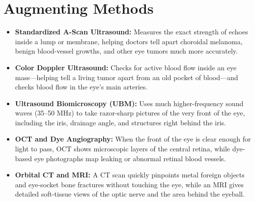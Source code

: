 \section{Augmenting Methods}
\begin{itemize}
    \item \textbf{Standardized A-Scan Ultrasound:} Measures the exact strength of echoes inside a lump or membrane, helping doctors tell apart choroidal melanoma, benign blood-vessel growths, and other eye tumors much more accurately.
    \item \textbf{Color Doppler Ultrasound:} Checks for active blood flow inside an eye mass---helping tell a living tumor apart from an old pocket of blood---and checks blood flow in the eye's main arteries.
    \item \textbf{Ultrasound Biomicroscopy (UBM):} Uses much higher-frequency sound waves (35--50 MHz) to take razor-sharp pictures of the very front of the eye, including the iris, drainage angle, and structures right behind the iris.
    \item \textbf{OCT and Dye Angiography:} When the front of the eye is clear enough for light to pass, OCT shows microscopic layers of the central retina, while dye-based eye photographs map leaking or abnormal retinal blood vessels.
    \item \textbf{Orbital CT and MRI:} A CT scan quickly pinpoints metal foreign objects and eye-socket bone fractures without touching the eye, while an MRI gives detailed soft-tissue views of the optic nerve and the area behind the eyeball.
\end{itemize}


